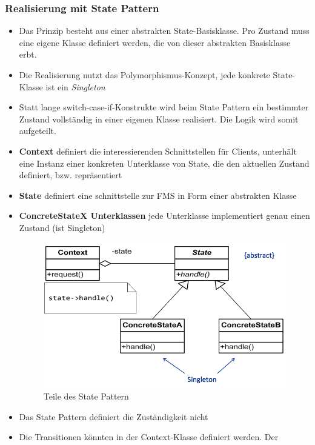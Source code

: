 \subsubsection{Realisierung mit State Pattern}
\begin{itemize}
  \item Das Prinzip besteht aus einer abstrakten State-Basisklasse. Pro Zustand
  muss eine eigene Klasse definiert werden, die von dieser abstrakten
  Basisklasse erbt.
  \item Die Realisierung nutzt das Polymorphismus-Konzept, jede konkrete
  State-Klasse ist ein \textit{Singleton}
  \item Statt lange switch-case-if-Konstrukte wird beim State Pattern ein
  bestimmter Zustand vollständig in einer eigenen Klasse realisiert. Die Logik
  wird somit aufgeteilt.
  \item \textbf{Context} definiert die interessierenden Schnittstellen für
  Clients, unterhält eine Instanz einer konkreten Unterklasse von State, die den
  aktuellen Zustand definiert, bzw. repräsentiert
  \item \textbf{State} definiert eine schnittstelle zur FMS in Form einer
  abstrakten Klasse
  \item \textbf{ConcreteStateX Unterklassen} jede Unterklasse implementiert
  genau einen Zustand (ist Singleton)
 \begin{figure}[h]
  \centering
  {\includegraphics[scale = 0.4]{images/FSM/state_pattern}  
  \caption{Teile des State Pattern}
  \label{fig:state_pattern}}
\end{figure}
\item Das State Pattern definiert die Zuständigkeit nicht
\item Die Transitionen könnten in der Context-Klasse definiert werden. Der

\end{itemize}
